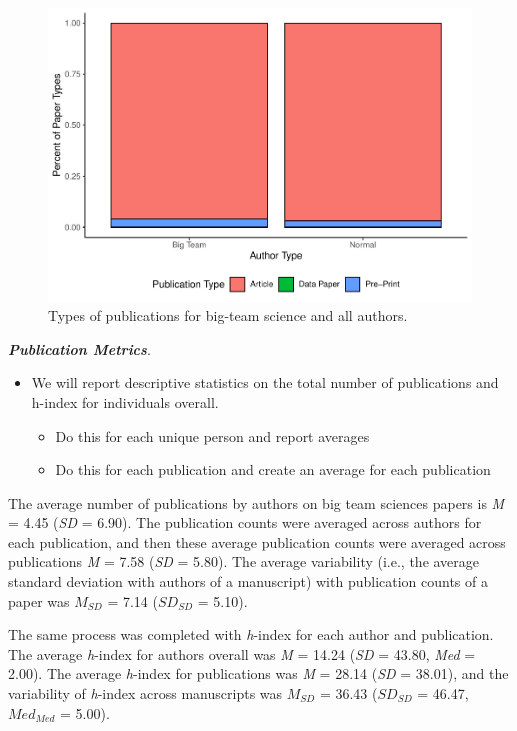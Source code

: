\documentclass[
  man]{apa7}
\providecommand{\tightlist}{%
  \setlength{\itemsep}{0pt}\setlength{\parskip}{0pt}}
\begin{document}
\begin{figure}
\centering
\includegraphics{manuscript_scopus_files/figure-latex/fig-pub-types-1.pdf}
\caption{\label{fig:fig-pub-types}Types of publications for big-team science and all authors.}
\end{figure}

\textbf{\emph{Publication Metrics}}.

\begin{itemize}
\tightlist
\item
  We will report descriptive statistics on the total number of
  publications and h-index for individuals overall.

  \begin{itemize}
  \tightlist
  \item
    Do this for each unique person and report averages
  \item
    Do this for each publication and create an average for each
    publication
  \end{itemize}
\end{itemize}

The average number of publications by authors on big team sciences
papers is \emph{M} = 4.45 (\emph{SD} =
6.90). The publication counts were averaged across
authors for each publication, and then these average publication counts
were averaged across publications \emph{M} = 7.58 (\emph{SD} =
5.80). The average variability (i.e., the average
standard deviation with authors of a manuscript) with publication counts
of a paper was \(M_{SD}\) = 7.14 (\(SD_{SD}\) =
5.10).

The same process was completed with \emph{h}-index for each author and
publication. The average \emph{h}-index for authors overall was \emph{M} =
14.24 (\emph{SD} = 43.80, \emph{Med} = 2.00). The
average \emph{h}-index for publications was \emph{M} = 28.14 (\emph{SD}
= 38.01), and the variability of \emph{h}-index across
manuscripts was \(M_{SD}\) = 36.43 (\(SD_{SD}\) =
46.47, \(Med_{Med}\) = 5.00).
\end{document}
